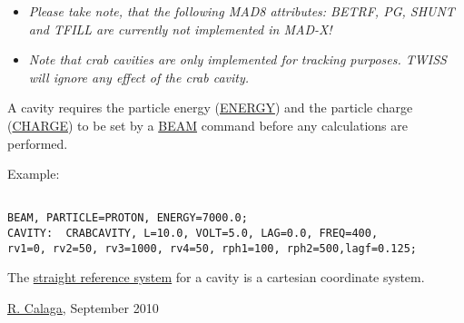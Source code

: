 \begin{itemize}
	\item \textit{ Please take note, that the following MAD8 attributes: BETRF, PG, SHUNT and TFILL are currently not implemented in MAD-X!}
	\item \textit{ Note that crab cavities are only implemented for tracking  purposes. TWISS will ignore any effect of the crab cavity.  
% 
}
\end{itemize} A cavity requires the particle energy (\href{beam.html#energy}{ENERGY}) and the particle charge (\href{beam.html#charge}{CHARGE}) to be set by a \href{beam.html}{BEAM} command before any calculations are performed. 

 Example: 
\begin{verbatim}

BEAM, PARTICLE=PROTON, ENERGY=7000.0;
CAVITY:  CRABCAVITY, L=10.0, VOLT=5.0, LAG=0.0, FREQ=400,
rv1=0, rv2=50, rv3=1000, rv4=50, rph1=100, rph2=500,lagf=0.125;

\end{verbatim} The \href{local_system.html#straight}{straight reference system} for a cavity is a cartesian coordinate system. 

\href{http://www.cern.ch/rcalaga}{R. Calaga}, September 2010 

